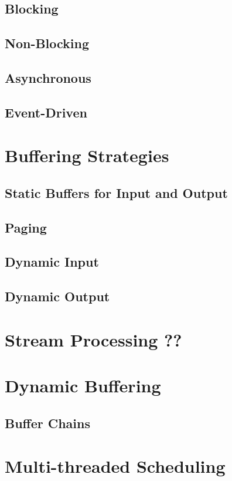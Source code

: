 \documentclass[abstracton,a4paper,twocolumn,9pt]{scrartcl}
\begin{document}
  \subsection{Blocking}
  \subsection{Non-Blocking}
  \subsection{Asynchronous}
  \subsection{Event-Driven}

\section{Buffering Strategies}
  \subsection{Static Buffers for Input and Output}
  \subsection{Paging}
  \subsection{Dynamic Input}
  \subsection{Dynamic Output}

\section{Stream Processing ??}

\section{Dynamic Buffering}
  \subsection{Buffer Chains}

\section{Multi-threaded Scheduling}
\end{document}
